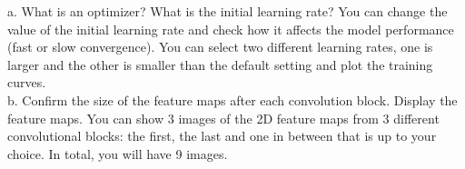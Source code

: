 a. What is an optimizer? What is the initial learning rate? You can change the value of the initial learning rate and check how it affects the model performance (fast or slow convergence). You can select two different learning rates, one is larger and the other is
smaller than the default setting and plot the training curves. \\
b. Confirm the size of the feature maps after each convolution block. Display the feature maps. You can show 3 images of the 2D feature maps from 3 different convolutional blocks: the first, the last and one in between that is up to your choice. In total, you will have 9 images.